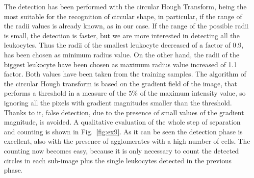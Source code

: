 {	The detection has been performed with the circular Hough Transform, being the most suitable for the recognition of circular shape, in particular, if the range of the radii values is already known, as in our case. If the range of the possible radii is small, the detection is faster, but we are more interested in detecting all the leukocytes. Thus the radii of the smallest leukocyte decreased of a factor of 0.9, has been chosen as minimum radius value. On the other hand, the radii of the biggest leukocyte have been chosen as maximum radius value increased of 1.1 factor. Both values have been taken from the training samples. The algorithm of the circular Hough transform is based on the gradient field of the image, that performs a threshold in a measure of the 5\% of the maximum intensity value, so ignoring all the pixels with gradient magnitudes smaller than the threshold. Thanks to it, false detection, due to the presence of small values of the gradient magnitude, is avoided. A qualitative evaluation of the whole step of separation and counting is shown in Fig.~\ref{fig:ex9}.  As it can be seen the detection phase is excellent, also with the presence of agglomerates with a high number of cells. The counting now becomes easy, because it is only necessary to count the detected circles in each sub-image plus the single leukocytes detected in the previous phase.
	
}
